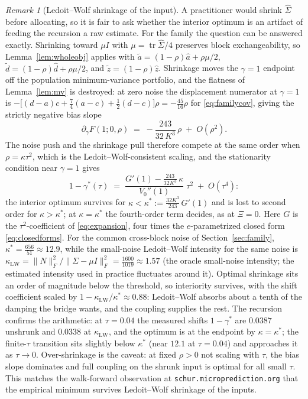\documentclass[11pt]{article}
\theoremstyle{remark}
\newtheorem{remark}{Remark}
\begin{document}
\begin{remark}[Ledoit--Wolf shrinkage of the input]
\label{rem:lw}
A practitioner would shrink $\widehat\Sigma$ before allocating, so it is
fair to ask whether the interior optimum is an artifact of feeding the
recursion a raw estimate. For the family the question can be answered
exactly. Shrinking toward $\mu I$ with $\mu = \operatorname{tr}
\widehat\Sigma/4$ preserves block exchangeability, so
Lemma~\ref{lem:wholeobj} applies with
$\tilde a = (1-\rho)\hat a + \rho\mu/2$,
$\tilde d = (1-\rho)\hat d + \rho\mu/2$, and
$\tilde z = (1-\rho)\hat z$. Shrinkage moves the $\gamma = 1$ endpoint
off the population minimum-variance portfolio, and the flatness of
Lemma~\ref{lem:mv} is destroyed: at zero noise the displacement numerator
at $\gamma = 1$ is $-\big[(d-a)c + \tfrac74(a-c) + \tfrac12(d-c)\big]\rho
= -\tfrac{45}{16}\rho$ for \eqref{eq:familycov}, giving the strictly
negative bias slope
\[
  \partial_\gamma F(1; 0, \rho) \;=\; -\frac{243}{32\,K^3}\,\rho
  \;+\; O(\rho^2).
\]
The noise push and the shrinkage pull therefore compete at the same order
when $\rho = \kappa\tau^2$, which is the Ledoit--Wolf-consistent scaling,
and the stationarity condition near $\gamma = 1$ gives
\[
  1 - \gamma^*(\tau)
  \;=\; \frac{G'(1) - \tfrac{243}{32 K^3}\,\kappa}{V_0''(1)}\;\tau^2
  \;+\; O(\tau^4):
\]
the interior optimum survives for
$\kappa < \kappa^* := \tfrac{32 K^3}{243}\, G'(1)$ and is lost to
second order for $\kappa > \kappa^*$; at $\kappa = \kappa^*$ the
fourth-order term decides, as at $\Xi = 0$. Here $G$ is the
$\tau^2$-coefficient of \eqref{eq:expansion}, four times the
$e$-parametrized closed form \eqref{eq:closedforms}. For the common
cross-block noise of Section~\ref{sec:family}, $\kappa^* =
\tfrac{656}{51} \approx 12.9$, while the small-noise Ledoit--Wolf
intensity for the same noise is $\kappa_{\mathrm{LW}} =
\|N\|_F^2 / \|\Sigma - \mu I\|_F^2 = \tfrac{1600}{1019} \approx 1.57$
(the oracle small-noise intensity; the estimated intensity used in
practice fluctuates around it).
Optimal shrinkage sits an order of magnitude below the threshold, so
interiority survives, with the shift coefficient scaled by
$1 - \kappa_{\mathrm{LW}}/\kappa^* \approx 0.88$: Ledoit--Wolf absorbs
about a tenth of the damping the bridge wants, and the coupling supplies
the rest. The recursion confirms the arithmetic: at $\tau = 0.04$ the
measured shifts $1 - \gamma^*$ are $0.0387$ unshrunk and $0.0338$ at
$\kappa_{\mathrm{LW}}$, and the optimum is at the endpoint by
$\kappa = \kappa^*$; the finite-$\tau$ transition sits slightly below
$\kappa^*$ (near $12.1$ at $\tau = 0.04$) and approaches it as
$\tau \to 0$. Over-shrinkage is the caveat: at fixed
$\rho > 0$ not scaling with $\tau$, the bias slope dominates and full
coupling on the shrunk input is optimal for all small $\tau$. This
matches the walk-forward observation at
\texttt{schur.microprediction.org} that the empirical minimum survives
Ledoit--Wolf shrinkage of the inputs.
\end{remark}
\end{document}
